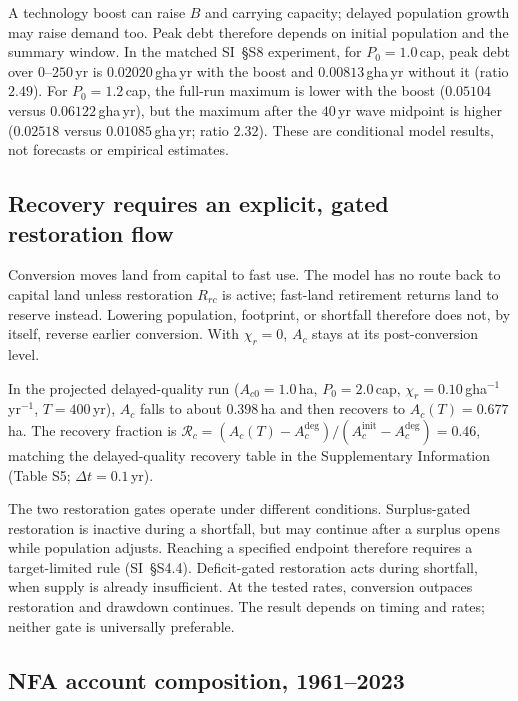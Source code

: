 \documentclass[preprint,12pt,authoryear]{elsarticle}
\begin{document}
A technology boost can raise $B$ and carrying capacity; delayed population growth may raise demand too. Peak debt therefore depends on initial population and the summary window. In the matched SI~\S S8 experiment, for $P_0=1.0$\,cap, peak debt over $0$--$250$\,yr is $0.02020$\,gha\,yr with the boost and $0.00813$\,gha\,yr without it (ratio $2.49$). For $P_0=1.2$\,cap, the full-run maximum is lower with the boost ($0.05104$ versus $0.06122$\,gha\,yr), but the maximum after the $40$\,yr wave midpoint is higher ($0.02518$ versus $0.01085$\,gha\,yr; ratio $2.32$). These are conditional model results, not forecasts or empirical estimates.

\subsection{Recovery requires an explicit, gated restoration flow}\label{sec:recovery}

Conversion moves land from capital to fast use. The model has no route back to capital land unless restoration $R_{rc}$ is active; fast-land retirement returns land to reserve instead. Lowering population, footprint, or shortfall therefore does not, by itself, reverse earlier conversion. With $\chi_r=0$, $A_c$ stays at its post-conversion level.

In the projected delayed-quality run ($A_{c0}=1.0$\,ha, $P_0=2.0$\,cap, $\chi_r=0.10$\,gha$^{-1}$\,yr$^{-1}$, $T=400$\,yr), $A_c$ falls to about $0.398$\,ha and then recovers to $A_c(T)=0.677$\,ha. The recovery fraction is $\mathcal R_c=(A_c(T)-A_c^{\mathrm{deg}})/(A_c^{\mathrm{init}}-A_c^{\mathrm{deg}})=0.46$, matching the delayed-quality recovery table in the Supplementary Information (Table S5; $\Delta t=0.1$\,yr).

The two restoration gates operate under different conditions. Surplus-gated restoration is inactive during a shortfall, but may continue after a surplus opens while population adjusts. Reaching a specified endpoint therefore requires a target-limited rule (SI~\S S4.4). Deficit-gated restoration acts during shortfall, when supply is already insufficient. At the tested rates, conversion outpaces restoration and drawdown continues. The result depends on timing and rates; neither gate is universally preferable.

\subsection{NFA account composition, 1961--2023}\label{sec:empirical}
\end{document}
